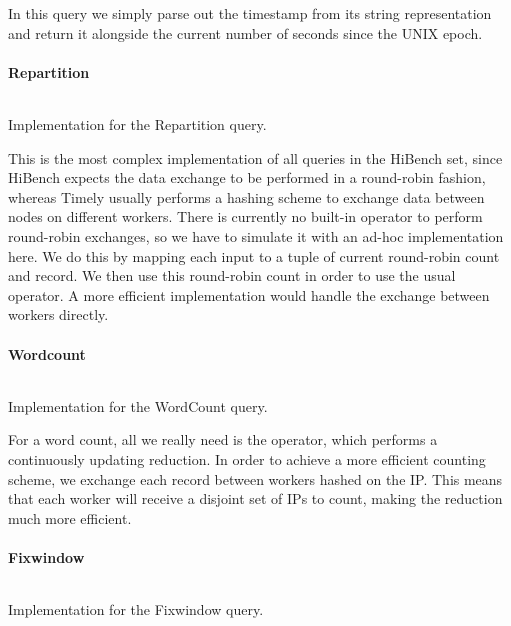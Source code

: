 In this query we simply parse out the timestamp from its string representation and return it alongside the current number of seconds since the UNIX epoch.

\paragraph{Repartition}
\begin{listing}[H]
  \inputminted[firstline=133,lastline=146]{rust}{benchmarks/src/hibench.rs}
  \caption{Implementation for the Repartition query.}
  \label{lst:hibench-repartition}
\end{listing}

This is the most complex implementation of all queries in the HiBench set, since HiBench expects the data exchange to be performed in a round-robin fashion, whereas Timely usually performs a hashing scheme to exchange data between nodes on different workers. There is currently no built-in operator to perform round-robin exchanges, so we have to simulate it with an ad-hoc implementation here. We do this by mapping each input to a tuple of current round-robin count and record. We then use this round-robin count in order to use the usual  operator. A more efficient implementation would handle the exchange between workers directly.

\paragraph{Wordcount}
\begin{listing}[H]
  \inputminted[firstline=181,lastline=184]{rust}{benchmarks/src/hibench.rs}
  \caption{Implementation for the WordCount query.}
  \label{lst:hibench-wordcount}
\end{listing}

For a word count, all we really need is the  operator, which performs a continuously updating reduction. In order to achieve a more efficient counting scheme, we exchange each record between workers hashed on the IP. This means that each worker will receive a disjoint set of IPs to count, making the reduction much more efficient.

\paragraph{Fixwindow}
\begin{listing}[H]
  \inputminted[firstline=220,lastline=224]{rust}{benchmarks/src/hibench.rs}
  \caption{Implementation for the Fixwindow query.}
  \label{lst:hibench-fixwindow}
\end{listing}

